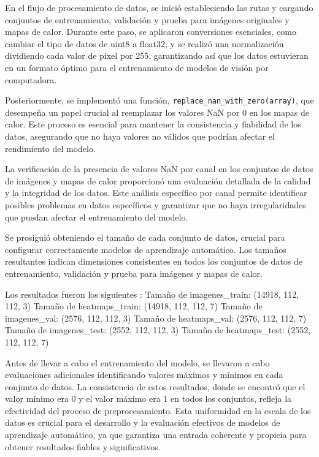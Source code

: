 \documentclass[runningheads]{llncs}
\begin{document}
En el flujo de procesamiento de datos, se inició estableciendo las rutas y cargando conjuntos de entrenamiento, validación y prueba para imágenes originales y mapas de calor. Durante este paso, se aplicaron conversiones esenciales, como cambiar el tipo de datos de uint8 a float32, y se realizó una normalización dividiendo cada valor de píxel por 255, garantizando así que los datos estuvieran en un formato óptimo para el entrenamiento de modelos de visión por computadora.

Posteriormente, se implementó una función, \verb|replace_nan_with_zero(array)|, que desempeña un papel crucial al reemplazar los valores NaN por 0 en los mapas de calor. Este proceso es esencial para mantener la consistencia y fiabilidad de los datos, asegurando que no haya valores no válidos que podrían afectar el rendimiento del modelo.

La verificación de la presencia de valores NaN por canal en los conjuntos de datos de imágenes y mapas de calor proporcionó una evaluación detallada de la calidad y la integridad de los datos. Este análisis específico por canal permite identificar posibles problemas en datos específicos y garantizar que no haya irregularidades que puedan afectar el entrenamiento del modelo.

Se prosiguió obteniendo el tamaño de cada conjunto de datos, crucial para configurar correctamente modelos de aprendizaje automático. Los tamaños resultantes indican dimensiones consistentes en todos los conjuntos de datos de entrenamiento, validación y prueba para imágenes y mapas de calor.

Los resultados fueron los siguientes : 
Tamaño de imagenes\_train: (14918, 112, 112, 3) 
Tamaño de heatmaps\_train: (14918, 112, 112, 7) 
Tamaño de imagenes\_val: (2576, 112, 112, 3) 
Tamaño de heatmaps\_val: (2576, 112, 112, 7) 
Tamaño de imagenes\_test: (2552, 112, 112, 3) 
Tamaño de heatmaps\_test: (2552, 112, 112, 7) 

Antes de llevar a cabo el entrenamiento del modelo, se llevaron a cabo evaluaciones adicionales identificando valores máximos y mínimos en cada conjunto de datos. La consistencia de estos resultados, donde se encontró que el valor mínimo era 0 y el valor máximo era 1 en todos los conjuntos, refleja la efectividad del proceso de preprocesamiento. Esta uniformidad en la escala de los datos es crucial para el desarrollo y la evaluación efectivos de modelos de aprendizaje automático, ya que garantiza una entrada coherente y propicia para obtener resultados fiables y significativos.
\end{document}
